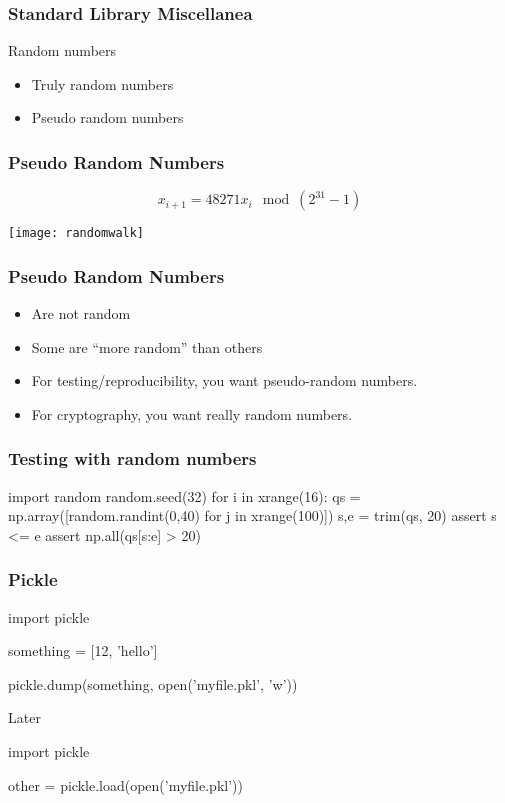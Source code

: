 \begin{frame}[fragile]
\frametitle{Standard Library Miscellanea}
Random numbers
\begin{itemize}
\item Truly random numbers
\item Pseudo random numbers
\end{itemize}
\end{frame}

\begin{frame}[fragile]
\frametitle{Pseudo Random Numbers}

\[
x_{i+1} = 48271 x_i \mod (2^{31}-1)
\]

\centering
\texttt{[image: randomwalk]}

\end{frame}

\begin{frame}[fragile]
\frametitle{Pseudo Random Numbers}
\begin{itemize}
\item Are not random
\item Some are ``more random'' than others
\end{itemize}
\pause

\begin{itemize}
\item For testing/reproducibility, you want \alert{pseudo-}random numbers.
\item For cryptography, you want really random numbers.
\end{itemize}
\end{frame}

\begin{frame}[fragile]
\frametitle{Testing with random numbers}

\begin{python}
import random
random.seed(32)
for i in xrange(16):
    qs = np.array([random.randint(0,40) for j in xrange(100)])
    s,e = trim(qs, 20)
    assert s <= e
    assert np.all(qs[s:e] > 20)
\end{python}
\end{frame}

\begin{frame}[fragile]
\frametitle{Pickle}

\begin{python}
import pickle

something = [12, 'hello']

pickle.dump(something, open('myfile.pkl', 'w'))
\end{python}

Later

\begin{python}
import pickle

other = pickle.load(open('myfile.pkl'))
\end{python}
\end{frame}

